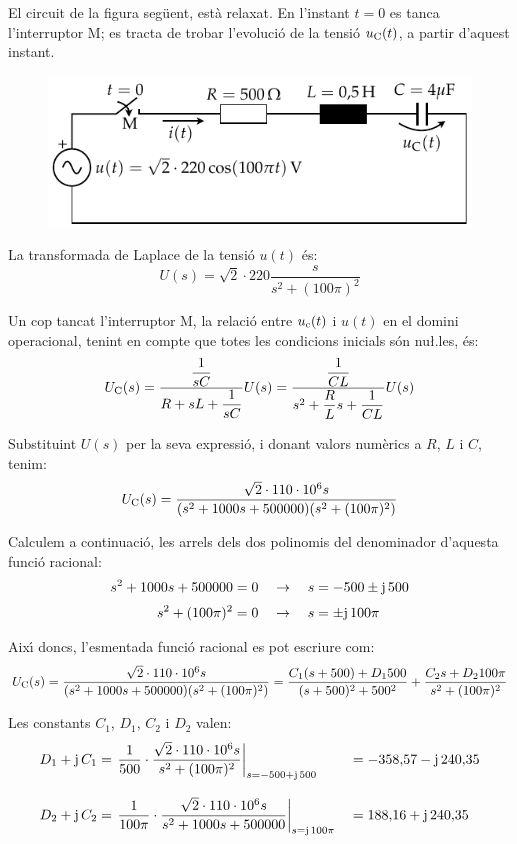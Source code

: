 \break
\begin{exemple}
El circuit de la figura seg\"{u}ent, est\`{a} relaxat. En l'instant $t=0$ es
tanca l'interruptor M; es tracta de trobar l'evoluci\'{o} de la tensi\'{o}
$u_\mathrm{C}(t)$, a partir d'aquest instant.
\begin{figure}[h]
\centering
    \includegraphics{Imatges/Cap-Laplace-Exemple4-Circuit.pdf}
\end{figure}


La transformada de Laplace de la tensi\'{o} $u(t)$ \'{e}s:
\[
    U(s) = \sqrt{2}\cdot 220 \frac{s}{s^2 + (100\pi)^2}
\]

Un cop tancat l'interruptor M, la relaci\'{o} entre $u_\mathrm{c}(t)$ i
$u(t)$ en el domini operacional, tenint en compte que totes les
condicions inicials s\'{o}n nu{\l.l}es, \'{e}s:
\[
    U_\mathrm{C}(s) = \frac{\dfrac{1}{sC}}{R+ sL +\dfrac{1}{sC}} U(s)=
    \frac{\dfrac{1}{CL}}{s^2 + \dfrac{R}{L}s +\dfrac{1}{CL}} U(s)
\]

Substituint $U(s)$ per la seva expressi\'{o}, i donant valors num\`{e}rics a
$R$, $L$ i $C$, tenim:
\[
    U_\mathrm{C}(s) = \frac{\sqrt{2}\cdot 110\cdot 10^6 s}{(s^2 + 1000 s + 500000)(s^2 + (100\pi)^2)}
\]

Calculem a continuaci\'{o}, les arrels dels dos polinomis  del
denominador d'aquesta funci\'{o} racional:
\begin{align*}
    s^2 + 1000 s + 500000 &= 0 \quad\rightarrow\quad s = -500
    \pm\mathrm{j}\,500 \\[0.5ex]
    s^2 + (100\pi)^2 &= 0 \quad\rightarrow\quad s = \pm\mathrm{j}\,100\pi
\end{align*}

Aix\'{\i} doncs, l'esmentada funci\'{o} racional es pot escriure com:
\[
U_\mathrm{C}(s) =\frac{\sqrt{2}\cdot 110\cdot 10^6 s}{(s^2 + 1000 s +
500000)(s^2 + (100\pi)^2)}  = \frac{C_1 (s+500) + D_1
500}{(s+500)^2+500^2} + \frac{C_2 s + D_2 100 \pi}{s^2 +(100\pi)^2}
\]

Les constants $C_1$, $D_1$,  $C_2$ i $D_2$ valen:
\begin{alignat*}{2}
    D_1 + \mathrm{j}\,C_1 &= \left.\frac{1}{500}\cdot \frac{\sqrt{2}\cdot 110\cdot 10^6 s}
    {s^2 +(100\pi)^2}\right|_{s=-500+\mathrm{j}\,500} &&=-358{,}57 -\mathrm{j}\,
    240{,}35\\[2ex]
    D_2 + \mathrm{j}\,C_2 &= \left.\frac{1}{100\pi}\cdot\frac{\sqrt{2}\cdot 110\cdot 10^6 s}
    {s^2 + 1000 s + 500000}\right|_{s=\mathrm{j}\,100\pi} &&= 188{,}16 + \mathrm{j}\,240{,}35
\end{alignat*}


\end{exemple}
